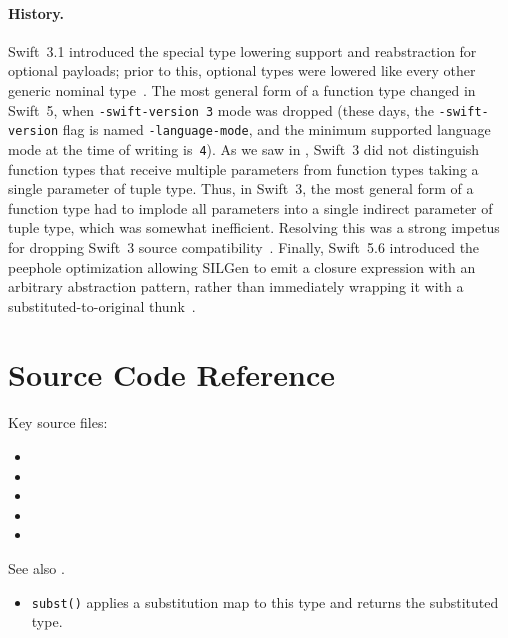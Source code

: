 \documentclass[../generics]{subfiles}
\begin{document}
\paragraph{History.}
Swift~3.1 introduced the special type lowering support and reabstraction for optional payloads; prior to this, optional types were lowered like every other generic nominal type~\cite{optionalpayload}. The most general form of a function type changed in Swift~5, when \verb|-swift-version 3| mode was dropped (these days, the \texttt{-swift-version} flag is named \texttt{-language-mode}, and the minimum supported language mode at the time of writing is~\texttt{4}). As we saw in , Swift~3 did not distinguish function types that receive multiple parameters from function types taking a single parameter of tuple type. Thus, in Swift~3, the most general form of a function type had to implode all parameters into a single indirect parameter of tuple type, which was somewhat inefficient. Resolving this was a strong impetus for dropping Swift~3 source compatibility~\cite{mostopaque}. Finally, Swift~5.6 introduced the peephole optimization allowing SILGen to emit a closure expression with an arbitrary abstraction pattern, rather than immediately wrapping it with a substituted-to-original thunk~\cite{emitabstract}.

\section{Source Code Reference}\label{src:substitution maps}

Key source files:
\begin{itemize}
\item {}
\item {}
\item {}
\item {}
\item {}
\end{itemize}

See also .
\begin{itemize}
\item \texttt{subst()} applies a substitution map to this type and returns the substituted type.
\end{itemize}
\end{document}
